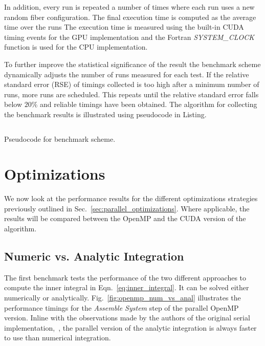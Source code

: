 In addition, every run is repeated a number of times where each run uses a new random fiber configuration. The final execution time is computed as the average time over the runs The execution time is measured using the built-in CUDA timing events for the GPU implementation and the Fortran \emph{SYSTEM\_CLOCK} function is used for the CPU implementation.

To further improve the statistical significance of the result the benchmark scheme dynamically adjusts the number of runs measured for each test. If the relative standard error (RSE) of timings collected is too high after a minimum number of runs, more runs are scheduled. This repeats until the relative standard error falls below $20\%$ and reliable timings have been obtained.  The algorithm for collecting the benchmark results is illustrated using pseudocode in Listing. 

\begin{listing}[!htbp]
  \centering
  \inputminted[mathescape,
    linenos,
    numbersep=5pt,
    fontsize=\footnotesize,
    frame=lines,
    framesep=2mm]{c}{lst/benchmark_scheme.lst}
  \caption{Pseudocode for benchmark scheme.}
  \label{lst:pseudo_benchmark}
\end{listing}

\section{Optimizations}
\label{sec:bench_optimization}

We now look at the performance results for the different optimizations strategies previously outlined in Sec.~\ref{sec:parallel_optimizations}. Where applicable, the results will be compared between the OpenMP and the CUDA version of the algorithm.

\subsection{Numeric vs. Analytic Integration}
\label{subsec:bench_numeric_vs_analytic}

The first benchmark tests the performance of the two different approaches to compute the inner integral in Eqn.~\eqref{eq:inner_integral}. It can be solved either numerically or analytically. Fig.~\ref{fig:openmp_num_vs_anal} illustrates the performance timings for the \emph{Assemble System} step of the parallel OpenMP version. Inline with the observations made by the authors of the original serial implementation,~\cite{Tornberg2006}, the parallel version of the analytic integration is always faster to use than numerical integration.

